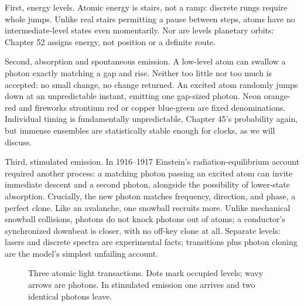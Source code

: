 \begin{mainline}
First, energy levels. Atomic energy is stairs, not a ramp: discrete rungs require whole jumps. Unlike real stairs permitting a pause between steps, atoms have no intermediate-level states even momentarily. Nor are levels planetary orbits: Chapter 52 assigns energy, not position or a definite route.

Second, absorption and spontaneous emission. A low-level atom can swallow a photon exactly matching a gap and rise. Neither too little nor too much is accepted: no small change, no change returned. An excited atom randomly jumps down at an unpredictable instant, emitting one gap-sized photon. Neon orange-red and fireworks strontium red or copper blue-green are fixed denominations. Individual timing is fundamentally unpredictable, Chapter 45's probability again, but immense ensembles are statistically stable enough for clocks, as we will discuss.

Third, stimulated emission. In 1916--1917 Einstein's radiation-equilibrium account required another process: a matching photon passing an excited atom can invite immediate descent and a second photon, alongside the possibility of lower-state absorption. Crucially, the new photon matches frequency, direction, and phase, a perfect clone. Like an avalanche, one snowball recruits more. Unlike mechanical snowball collisions, photons do not knock photons out of atoms; a conductor's synchronized downbeat is closer, with no off-key clone at all. Separate levels: lasers and discrete spectra are experimental facts; transitions plus photon cloning are the model's simplest unfailing account.
\end{mainline}

\begin{figure}[htbp]
\centering
{}
\caption{Three atomic light transactions. Dots mark occupied levels; wavy arrows are photons. In stimulated emission one arrives and two identical photons leave.}
\end{figure}

